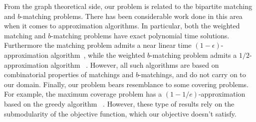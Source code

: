 From the graph theoretical side, our problem is related to the bipartite matching and $b$-matching problems. There has been considerable work done in this area when it comes to approximation algorithms. In particular, both the weighted matching and $b$-matching problems have exact polynomial time solutions. Furthermore the matching problem admits a near linear time $(1-\epsilon)$-approximation algorithm~\cite{duan2010approximating}, while the weighted $b$-matching problem admits a $1/2$-approximation algorithm ~\cite{koufogiannakis2009distributed}. However, all such algorithms are based on combinatorial properties of matchings and $b$-matchings, and do not carry on to our domain. Finally, our problem bears resemblance to some covering problems. For example, the maximum coverage problem has a $(1-1/e)$-approximation based on the greedy algorithm ~\cite{nemhauser1978analysis}. However, these type of results rely on the submodularity of the objective function, which our objective doesn't satisfy.

